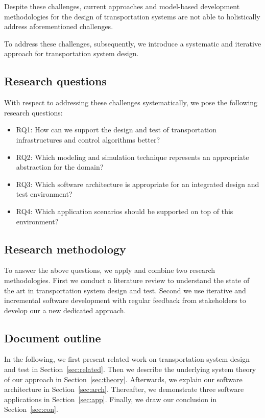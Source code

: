 \documentclass{IEEEtran}
\begin{document}
    Despite these challenges, current approaches and model-based development methodologies for the design of transportation systems are not able to holistically address aforementioned challenges.
    
    To address these challenges, subsequently, we introduce a systematic and iterative approach for transportation system design.

    \newpage

    \subsection{Research questions}
    With respect to addressing these challenges systematically, we pose the following research questions:
    \begin{itemize}
    \item RQ1: How can we support the design and test of transportation infrastructures and control algorithms better?
    \item RQ2: Which modeling and simulation technique represents an appropriate abstraction for the domain?
    \item RQ3: Which software architecture is appropriate for an integrated design and test environment?
    \item RQ4: Which application scenarios should be supported on top of this environment?
    \end{itemize}

    \subsection{Research methodology}
    To answer the above questions, we apply and combine two research methodologies.
    First we conduct a literature review to understand the state of the art in transportation system design and test.
    Second we use iterative and incremental software development with regular feedback from stakeholders to develop our a new dedicated approach.

    \subsection{Document outline}
    In the following, we first present related work on transportation system design and test in Section~\ref{sec:related}.
    Then we describe the underlying system theory of our approach in Section~\ref{sec:theory}.
    Afterwards, we explain our software architecture in Section~\ref{sec:arch}.
    Thereafter, we demonstrate three software applications in Section~\ref{sec:app}.
    Finally, we draw our conclusion in Section~\ref{sec:con}.
    
\end{document}
